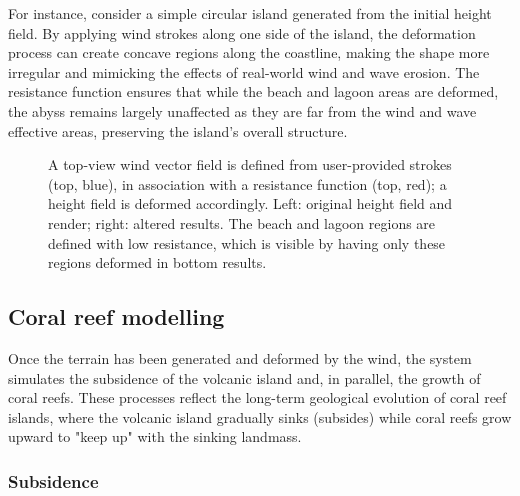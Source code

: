 For instance, consider a simple circular island generated from the initial height field. By applying wind strokes along one side of the island, the deformation process can create concave regions along the coastline, making the shape more irregular and mimicking the effects of real-world wind and wave erosion. The resistance function ensures that while the beach and lagoon areas are deformed, the abyss remains largely unaffected as they are far from the wind and wave effective areas, preserving the island's overall structure.

\begin{figure}
\caption{A top-view wind vector field is defined from user-provided strokes (top, blue), in association with a resistance function (top, red); a height field is deformed accordingly. Left: original height field and render; right: altered results. The beach and lagoon regions are defined with low resistance, which is visible by having only these regions deformed in bottom results.}
\label{fig:coral-island-wind-effect-result}
\end{figure}

\subsection{Coral reef modelling}
\label{sec:coral-island-coral-reef}


Once the terrain has been generated and deformed by the wind, the system simulates the subsidence of the volcanic island and, in parallel, the growth of coral reefs. These processes reflect the long-term geological evolution of coral reef islands, where the volcanic island gradually sinks (subsides) while coral reefs grow upward to "keep up" with the sinking landmass.

\subsubsection{Subsidence}
\label{sec:coral-island-subsidence}

